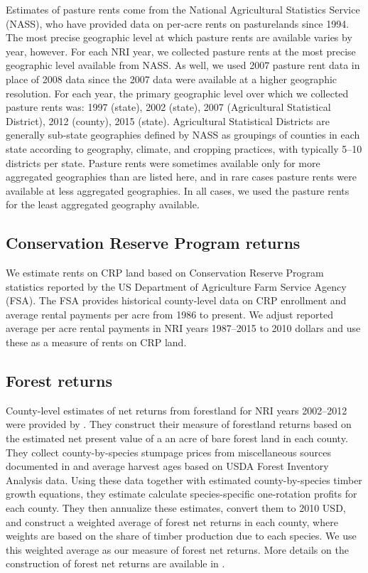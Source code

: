 \documentclass[11pt]{article}
\begin{document}
Estimates of pasture rents come from the National Agricultural Statistics Service (NASS), who have provided data on per-acre rents on pasturelands since 1994. The most precise geographic level at which pasture rents are available varies by year, however. For each NRI year, we collected pasture rents at the most precise geographic level available from NASS. As well, we used 2007 pasture rent data in place of 2008 data since the 2007 data were available at a higher geographic resolution. For each year, the primary geographic level over which we collected pasture rents was: 1997 (state), 2002 (state), 2007 (Agricultural Statistical District), 2012 (county), 2015 (state). Agricultural Statistical Districts are generally sub-state geographies defined by NASS as groupings of counties in each state according to geography, climate, and cropping practices, with typically 5--10 districts per state. Pasture rents were sometimes available only for more aggregated geographies than are listed here, and in rare cases pasture rents were available at less aggregated geographies. In all cases, we used the pasture rents for the least aggregated geography available.

\subsection{Conservation Reserve Program returns}

We estimate rents on CRP land based on Conservation Reserve Program statistics reported by the US Department of Agriculture Farm Service Agency (FSA). The FSA provides historical county-level data on CRP enrollment and average rental payments per acre from 1986 to present. We adjust reported average per acre rental payments in NRI years 1987--2015 to 2010 dollars and use these as a measure of rents on CRP land. 

\subsection{Forest returns}

County-level estimates of net returns from forestland for NRI years 2002--2012 were provided by \citet{mihiarlewis}. They construct their measure of forestland returns based on the estimated net present value of a an acre of bare forest land in each county. They collect county-by-species stumpage prices from miscellaneous sources documented in \citet{mihiar2017} and average harvest ages based on USDA Forest Inventory Analysis data. Using these data together with estimated county-by-species timber growth equations, they estimate calculate species-specific one-rotation profits for each county. They then annualize these estimates, convert them to 2010 USD, and construct a weighted average of forest net returns in each county, where weights are based on the share of timber production due to each species. We use this weighted average as our measure of forest net returns. More details on the construction of forest net returns are available in \citet{mihiarlewis}.
\end{document}

